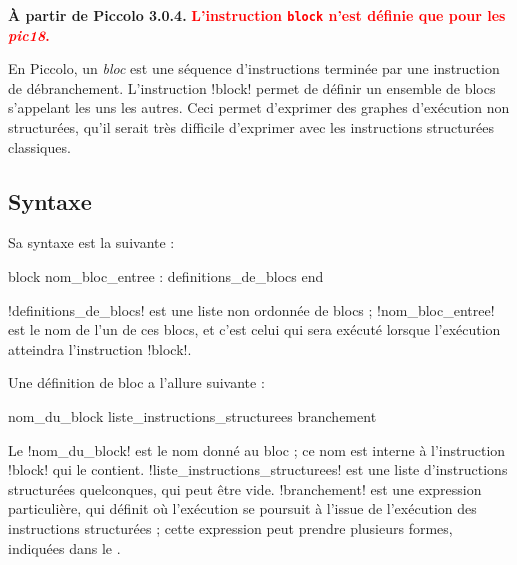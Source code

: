 
\textbf{À partir de Piccolo 3.0.4.} \textcolor{red}{\bf L'instruction \texttt{block} n'est définie que pour les \emph{pic18}.}

En Piccolo, un \emph{bloc} est une séquence d'instructions terminée par une instruction de débranchement. L'instruction \pic!block! permet de définir un ensemble de blocs s'appelant les uns les autres. Ceci permet d'exprimer des graphes d'exécution non structurées, qu'il serait très difficile d'exprimer avec les instructions structurées classiques. 

\subsection{Syntaxe}

Sa syntaxe est la suivante :


\begin{piccolo}
block nom_bloc_entree :
  definitions_de_blocs
end
\end{piccolo}

\pic!definitions_de_blocs! est une liste non ordonnée de blocs ; \pic!nom_bloc_entree! est le nom de l'un de ces blocs, et c'est celui qui sera exécuté lorsque l'exécution atteindra l'instruction \pic!block!.

Une définition de bloc a l'allure suivante :

\begin{piccolo}
nom_du_block { liste_instructions_structurees } branchement
\end{piccolo}

Le \pic!nom_du_block! est le nom donné au bloc ; ce nom est interne à l'instruction \pic!block! qui le contient. \pic!liste_instructions_structurees! est une liste d'instructions structurées quelconques, qui peut être vide. \pic!branchement! est une expression particulière, qui définit où l'exécution se poursuit à l'issue de l'exécution des instructions structurées ; cette expression peut prendre plusieurs formes, indiquées dans le .


